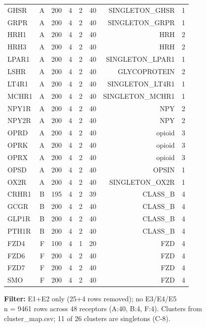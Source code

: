 \begin{table}[htbp]
\begin{tabular}{lrrrrrrr}
GHSR & A & 200 & 4 & 2 & 40 & SINGLETON\_GHSR & 1 \\
GRPR & A & 200 & 4 & 2 & 40 & SINGLETON\_GRPR & 1 \\
HRH1 & A & 200 & 4 & 2 & 40 & HRH & 2 \\
HRH3 & A & 200 & 4 & 2 & 40 & HRH & 2 \\
LPAR1 & A & 200 & 4 & 2 & 40 & SINGLETON\_LPAR1 & 1 \\
LSHR & A & 200 & 4 & 2 & 40 & GLYCOPROTEIN & 2 \\
LT4R1 & A & 200 & 4 & 2 & 40 & SINGLETON\_LT4R1 & 1 \\
MCHR1 & A & 200 & 4 & 2 & 40 & SINGLETON\_MCHR1 & 1 \\
NPY1R & A & 200 & 4 & 2 & 40 & NPY & 2 \\
NPY2R & A & 200 & 4 & 2 & 40 & NPY & 2 \\
OPRD & A & 200 & 4 & 2 & 40 & opioid & 3 \\
OPRK & A & 200 & 4 & 2 & 40 & opioid & 3 \\
OPRX & A & 200 & 4 & 2 & 40 & opioid & 3 \\
OPSD & A & 200 & 4 & 2 & 40 & OPSIN & 1 \\
OX2R & A & 200 & 4 & 2 & 40 & SINGLETON\_OX2R & 1 \\
CRHR1 & B & 195 & 4 & 2 & 39 & CLASS\_B & 4 \\
GCGR & B & 200 & 4 & 2 & 40 & CLASS\_B & 4 \\
GLP1R & B & 200 & 4 & 2 & 40 & CLASS\_B & 4 \\
PTH1R & B & 200 & 4 & 2 & 40 & CLASS\_B & 4 \\
FZD4 & F & 100 & 4 & 1 & 20 & FZD & 4 \\
FZD6 & F & 200 & 4 & 2 & 40 & FZD & 4 \\
FZD7 & F & 200 & 4 & 2 & 40 & FZD & 4 \\
SMO & F & 200 & 4 & 2 & 40 & FZD & 4 \\
\bottomrule
\end{tabular}
\begin{flushleft}\scriptsize
\textbf{Filter:} E1+E2 only (25+4 rows removed); no E3/E4/E5
 \\ n = 9461 rows across 48 receptors (A:40, B:4, F:4). Clusters from cluster\_map.csv; 11 of 26 clusters are singletons (C-8).
\end{flushleft}
\end{table}
